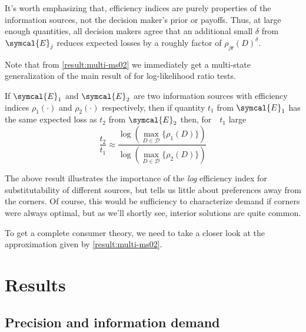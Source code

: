 \documentclass{fancyArticle}
\providecommand{\E}{\symcal{E}}             %
\renewcommand{\|}{\,|\,}                    %
\providecommand{\;}{\,;}                    %
\begin{document}
It's worth emphasizing that, efficiency indices are purely properties of the information sources, not the decision maker's prior or payoffs.
Thus, at large enough quantities, all decision makers agree that an additional small $\delta$ from $\E_j$ reduces expected losses by a roughly factor of $\rho_{j\mathbf{r}}(D)^{\delta}$.

Note that from \autoref{result:multi-ms02} we immediately get a multi-state generalization of the main result of \cite{Chernoff1952} for log-likelihood ratio tests.

\begin{corollary*}
  If $\E_1$ and $\E_2$ are two information sources with efficiency indices $\rho_1(\cdot)$ and $\rho_2(\cdot)$ respectively, then if quantity $t_1$ from $\E_1$ has the same expected loss as $t_2$ from $\E_2$ then, for\ \ $t_1$ large
  \begin{equation*}
    \label{eq:chernoff-are}
    \frac{t_2}{t_1} \approx
    \frac{\log(\max_{D\in \mathcal{D}}\{\rho_1(D)\})}
    {\log(\max_{D\in \mathcal{D}}\{\rho_2(D)\})}
  \end{equation*}
\end{corollary*}

The above result illustrates the importance of the \textit{log} efficiency index for substitutability of different sources, but tells us little about preferences away from the corners.
Of course, this would be sufficiency to characterize demand if corners were always optimal, but as we'll shortly see, interior solutions are quite common.

To get a complete consumer theory, we need to take a closer look at the approximation given by \autoref{result:multi-ms02}.


\section{Results}
\label{sec:results}



\subsection{Precision and information demand}\label{sec:demand}
\end{document}
